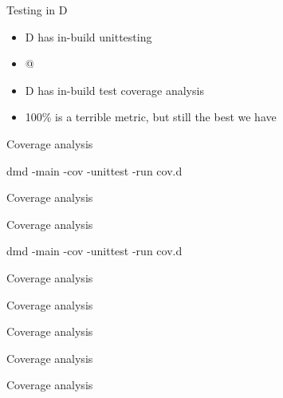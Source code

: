 \documentclass[aspectratio=169,notes]{beamer}
\begin{document}
	\begin{frame}[fragile]{Testing in D}
		\begin{itemize}
			\item D has in-build unittesting
			\item \lstinline@unittest { }@
			\item D has in-build test coverage analysis
			\item 100\% is a terrible metric, but still the best we have
		\end{itemize}
	\end{frame}

	\begin{frame}[fragile]{Coverage analysis}
		
		dmd -main -cov -unittest -run cov.d
	\end{frame}

	\begin{frame}[fragile]{Coverage analysis}
		
	\end{frame}

	\begin{frame}[fragile]{Coverage analysis}
		
		dmd -main -cov -unittest -run cov.d
	\end{frame}

	\begin{frame}[fragile]{Coverage analysis}
		
	\end{frame}

	\begin{frame}[fragile]{Coverage analysis}
		
	\end{frame}

	\begin{frame}[fragile]{Coverage analysis}
		
	\end{frame}

	\begin{frame}[fragile]{Coverage analysis}
		
	\end{frame}

	\begin{frame}[fragile]{Coverage analysis}
		
	\end{frame}
\end{document}
